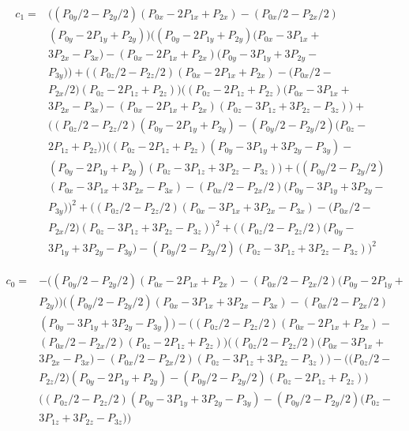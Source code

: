 \documentclass{article}
\begin{document}
\begin{equation}
\begin{aligned}
c_1 =& \big((P_{0y}/2 - P_{2y}/2)(P_{0x} - 2P_{1x} + P_{2x}) - (P_{0x}/2 - P_{2x}/2)\\
     & (P_{0y} - 2P_{1y} + P_{2y})\big)\big((P_{0y} - 2P_{1y} + P_{2y}) (P_{0x} - 3P_{1x} + \\
     & 3P_{2x} - P_{3x}) - (P_{0x} - 2P_{1x} + P_{2x})(P_{0y} - 3P_{1y} + 3P_{2y} - \\
     & P_{3y})\big) + \big((P_{0z}/2 - P_{2z}/2)(P_{0x} - 2P_{1x} + P_{2x}) - (P_{0x}/2 - \\
     & P_{2x}/2)(P_{0z} - 2P_{1z} + P_{2z})\big)\big((P_{0z} - 2P_{1z} + P_{2z})(P_{0x} - 3P_{1x} + \\
     & 3P_{2x} - P_{3x}) - (P_{0x} - 2P_{1x} + P_{2x})(P_{0z} - 3P_{1z} + 3P_{2z} - P_{3z})\big) + \\
     & \big((P_{0z}/2 - P_{2z}/2)(P_{0y} - 2P_{1y} + P_{2y}) - (P_{0y}/2 - P_{2y}/2)(P_{0z} - \\
     & 2P_{1z} + P_{2z})\big)\big((P_{0z} - 2P_{1z} + P_{2z})(P_{0y} - 3P_{1y} + 3P_{2y} - P_{3y}) - \\ 
     & (P_{0y} - 2P_{1y} + P_{2y})(P_{0z} - 3P_{1z} + 3P_{2z} - P_{3z})\big) + \big((P_{0y}/2 - P_{2y}/2) \\
     & (P_{0x} - 3P_{1x} + 3P_{2x} - P_{3x}) - (P_{0x}/2 - P_{2x}/2)(P_{0y} - 3P_{1y} + 3P_{2y} - \\
     & P_{3y})\big)^2 + \big((P_{0z}/2 - P_{2z}/2)(P_{0x} - 3P_{1x} + 3P_{2x} - P_{3x}) - (P_{0x}/2 - \\ 
     & P_{2x}/2)(P_{0z} - 3P_{1z} + 3P_{2z} - P_{3z})\big)^2 + \big((P_{0z}/2 - P_{2z}/2)(P_{0y} - \\
     & 3P_{1y} + 3P_{2y} - P_{3y}) - (P_{0y}/2 - P_{2y}/2)(P_{0z} - 3P_{1z} + 3P_{2z} - P_{3z})\big)^2
\end{aligned}
\end{equation}


\begin{equation}
\begin{aligned}
c_0 =& -\big((P_{0y}/2 - P_{2y}/2)(P_{0x} - 2P_{1x} + P_{2x}) - (P_{0x}/2 - P_{2x}/2)(P_{0y} - 2P_{1y} + \\
     & P_{2y})\big)\big((P_{0y}/2 - P_{2y}/2)(P_{0x} - 3P_{1x} + 3P_{2x} - P_{3x}) - (P_{0x}/2 - P_{2x}/2) \\
     & (P_{0y} - 3P_{1y} + 3P_{2y} - P_{3y})\big) - \big((P_{0z}/2 - P_{2z}/2)(P_{0x} - 2P_{1x} + P_{2x}) - \\
     & (P_{0x}/2 - P_{2x}/2)(P_{0z} - 2P_{1z} + P_{2z})\big)\big((P_{0z}/2 - P_{2z}/2)(P_{0x} - 3P_{1x} + \\
     & 3P_{2x} - P_{3x}) - (P_{0x}/2 - P_{2x}/2)(P_{0z} - 3P_{1z} + 3P_{2z} - P_{3z})\big) - \big((P_{0z}/2 - \\
     & P_{2z}/2)(P_{0y} - 2P_{1y} + P_{2y}) - (P_{0y}/2 - P_{2y}/2)(P_{0z} - 2P_{1z} + P_{2z})\big) \\
     & \big((P_{0z}/2 - P_{2z}/2)(P_{0y} - 3P_{1y} + 3P_{2y} - P_{3y}) - (P_{0y}/2 - P_{2y}/2)(P_{0z} - \\
     & 3P_{1z} + 3P_{2z} - P_{3z})\big)
\end{aligned}
\end{equation}




\end{document}
